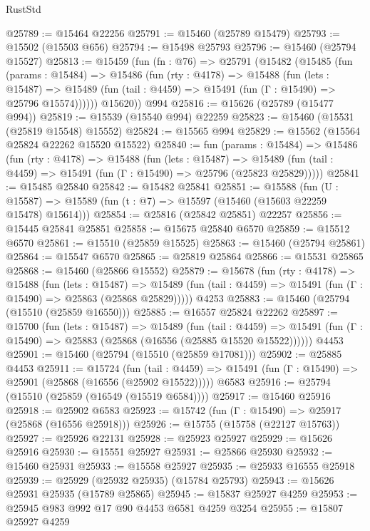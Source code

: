 \begin{lexlean}{RustStd}
\begin{coremodule}
@25789 := @15464 @22256
@25791 := @15460 (@25789 @15479)
@25793 := @15502 (@15503 @656)
@25794 := @15498 @25793
@25796 := @15460 (@25794 @15527)
@25813 := @15459
    (fun (fn : @76) =>
    @25791
      (@15482
        (@15485
          (fun (params : @15484) =>
          @15486
            (fun (rty : @4178) =>
            @15488
              (fun (lets : @15487) =>
              @15489 (fun (tail : @4459) => @15491 (fun (Γ : @15490) => @25796 @15574))))))
        @15620))
    @994
@25816 := @15626 (@25789 (@15477 @994))
@25819 := @15539 (@15540 @994) @22259
@25823 := @15460 (@15531 (@25819 @15548) @15552)
@25824 := @15565 @994
@25829 := @15562 (@15564 @25824 @22262 @15520 @15522)
@25840 := fun (params : @15484) =>
  @15486
    (fun (rty : @4178) =>
    @15488
      (fun (lets : @15487) =>
      @15489 (fun (tail : @4459) => @15491 (fun (Γ : @15490) => @25796 (@25823 @25829)))))
@25841 := @15485 @25840
@25842 := @15482 @25841
@25851 := @15588
    (fun (U : @15587) => @15589 (fun (t : @7) => @15597 (@15460 (@15603 @22259 @15478) @15614)))
@25854 := @25816 (@25842 @25851) @22257
@25856 := @15445 @25841 @25851
@25858 := @15675 @25840 @6570
@25859 := @15512 @6570
@25861 := @15510 (@25859 @15525)
@25863 := @15460 (@25794 @25861)
@25864 := @15547 @6570
@25865 := @25819 @25864
@25866 := @15531 @25865
@25868 := @15460 (@25866 @15552)
@25879 := @15678
    (fun (rty : @4178) =>
    @15488
      (fun (lets : @15487) =>
      @15489 (fun (tail : @4459) => @15491 (fun (Γ : @15490) => @25863 (@25868 @25829)))))
    @4253
@25883 := @15460 (@25794 (@15510 (@25859 @16550)))
@25885 := @16557 @25824 @22262
@25897 := @15700
    (fun (lets : @15487) =>
    @15489
      (fun (tail : @4459) =>
      @15491 (fun (Γ : @15490) => @25883 (@25868 (@16556 (@25885 @15520 @15522))))))
    @4453
@25901 := @15460 (@25794 (@15510 (@25859 @17081)))
@25902 := @25885 @4453
@25911 := @15724
    (fun (tail : @4459) => @15491 (fun (Γ : @15490) => @25901 (@25868 (@16556 (@25902 @15522)))))
    @6583
@25916 := @25794 (@15510 (@25859 (@16549 (@15519 @6584))))
@25917 := @15460 @25916
@25918 := @25902 @6583
@25923 := @15742 (fun (Γ : @15490) => @25917 (@25868 (@16556 @25918)))
@25926 := @15755 (@15758 (@22127 @15763))
@25927 := @25926 @22131
@25928 := @25923 @25927
@25929 := @15626 @25916
@25930 := @15551 @25927
@25931 := @25866 @25930
@25932 := @15460 @25931
@25933 := @15558 @25927
@25935 := @25933 @16555 @25918
@25939 := @25929 (@25932 @25935) (@15784 @25793)
@25943 := @15626 @25931 @25935 (@15789 @25865)
@25945 := @15837 @25927 @4259
@25953 := @25945 @983 @992 @17 @90 @4453 @6581 @4259 @3254
@25955 := @15807 @25927 @4259

\end{coremodule}
\end{lexlean}
